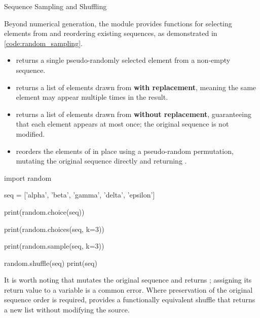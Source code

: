\documentclass[10pt]{article}
\begin{document}
    \begin{core}{Sequence Sampling and Shuffling}

      Beyond numerical generation, the  module provides functions for selecting elements from and reordering existing sequences, as demonstrated in \autoref{code:random_sampling}.

      \begin{itemize}

        \item {} returns a single pseudo-randomly selected element from a non-empty sequence.

        \item {} returns a list of  elements drawn from  \textbf{with replacement}, meaning the same element may appear multiple times in the result.

        \item {} returns a list of  elements drawn from  \textbf{without replacement}, guaranteeing that each element appears at most once; the original sequence is not modified.

        \item {} reorders the elements of  in place using a pseudo-random permutation, mutating the original sequence directly and returning .

      \end{itemize}

      \begin{pyconsole}

        import random

        seq = ['alpha', 'beta', 'gamma', 'delta', 'epsilon']

        print(random.choice(seq))

        print(random.choices(seq, k=3))

        print(random.sample(seq, k=3))

        random.shuffle(seq)
        print(seq)

      \end{pyconsole}

      It is worth noting that  mutates the original sequence and returns ; assigning its return value to a variable is a common error. Where preservation of the original sequence order is required,  provides a functionally equivalent shuffle that returns a new list without modifying the source.

    \end{core}
\end{document}
